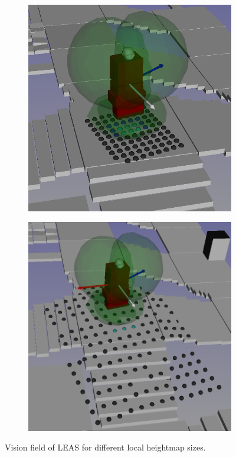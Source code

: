 \begin{figure}[h]
    \captionsetup[subfigure]{justification=centering}
    \begin{subfigure}[t]{.49\linewidth}
    \includegraphics[width=\textwidth]{Figures/Chapter_LEAS/hm_small_vision.png}
    \caption{\label{fig:vision_hm_size_short}}
    \end{subfigure}
    \begin{subfigure}[t]{.49\linewidth}
    \includegraphics[width=\textwidth]{Figures/Chapter_LEAS/hm_big_vision.png}
    \caption{\label{fig:vision_hm_size_big}}
    \end{subfigure}
    \caption{Vision field of LEAS for different local heightmap sizes.}
    \label{fig:vision_hm_size}
\end{figure}

